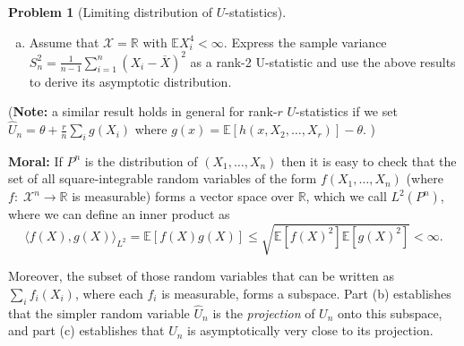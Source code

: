 \documentclass{article}
\newcommand{\cX}{\mathcal{X}}
\newcommand{\EE}{\mathbb{E}}
\newcommand{\RR}{\mathbb{R}}
\theoremstyle{definition}
\newtheorem{problem}{Problem}
\begin{document}
\begin{problem}[Limiting distribution of $U$-statistics]
\begin{enumerate}[(a)]
\item Assume that $\cX = \RR$ with $\EE X_i^4 <\infty$. Express the sample variance $S_{n}^{2} = \frac{1}{n-1}\sum_{i=1}^{n}(X_{i} - \overline{X})^{2}$ as a rank-2 U-statistic and use the above results to derive its asymptotic distribution.


\end{enumerate}

({\bf Note:} a similar result holds in general for rank-$r$ $U$-statistics if we set $\widehat{U}_n= \theta + \frac{r}{n}\sum_i g(X_i)$ where ${g(x) = \EE[h(x,X_2,\ldots,X_r)]-\theta}$. )

{\bf Moral:} If $P^n$ is the distribution of $(X_1,\ldots,X_n)$ then it is easy to check that the set of all square-integrable random variables of the form $f(X_1,\ldots,X_n)$ (where $f:\; \cX^n \to \RR$ is measurable) forms a vector space over $\RR$, which we call $L^2(P^n)$, where we can define an inner product as
\[
\langle f(X), g(X) \rangle_{L^2} = \EE[ f(X)g(X)] \leq \sqrt{\EE[f(X)^2] \EE[g(X)^2]} < \infty.
\]

Moreover, the subset of those random variables that can be written as $\sum_i f_i(X_i)$, where each $f_i$ is measurable, forms a subspace. Part (b) establishes that the simpler random variable $\widehat{U}_n$ is the {\em projection} of $U_n$ onto this subspace, and part (c) establishes that $U_n$ is asymptotically very close to its projection.
\end{problem}
\end{document}
